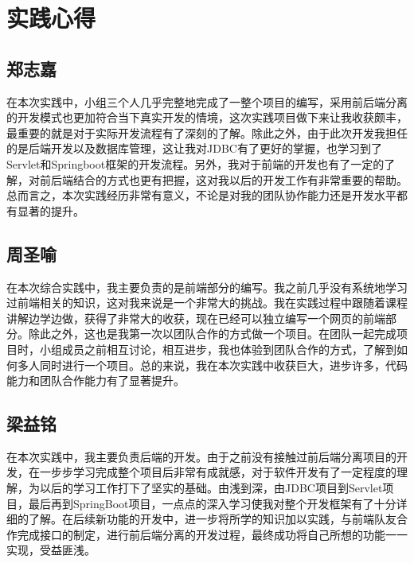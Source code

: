 
\chapter{实践心得}

\section*{郑志嘉}
在本次实践中，小组三个人几乎完整地完成了一整个项目的编写，采用前后端分离的开发模式也更加符合当下真实开发的情境，这次实践项目做下来让我收获颇丰，最重要的就是对于实际开发流程有了深刻的了解。除此之外，由于此次开发我担任的是后端开发以及数据库管理，这让我对JDBC有了更好的掌握，也学习到了Servlet和Springboot框架的开发流程。另外，我对于前端的开发也有了一定的了解，对前后端结合的方式也更有把握，这对我以后的开发工作有非常重要的帮助。总而言之，本次实践经历非常有意义，不论是对我的团队协作能力还是开发水平都有显著的提升。~\\

\section*{周圣喻}
在本次综合实践中，我主要负责的是前端部分的编写。我之前几乎没有系统地学习过前端相关的知识，这对我来说是一个非常大的挑战。我在实践过程中跟随着课程讲解边学边做，获得了非常大的收获，现在已经可以独立编写一个网页的前端部分。除此之外，这也是我第一次以团队合作的方式做一个项目。在团队一起完成项目时，小组成员之前相互讨论，相互进步，我也体验到团队合作的方式，了解到如何多人同时进行一个项目。总的来说，我在本次实践中收获巨大，进步许多，代码能力和团队合作能力有了显著提升。~\\

\section*{梁益铭}
在本次实践中，我主要负责后端的开发。由于之前没有接触过前后端分离项目的开发，在一步步学习完成整个项目后非常有成就感，对于软件开发有了一定程度的理解，为以后的学习工作打下了坚实的基础。由浅到深，由JDBC项目到Servlet项目，最后再到SpringBoot项目，一点点的深入学习使我对整个开发框架有了十分详细的了解。在后续新功能的开发中，进一步将所学的知识加以实践，与前端队友合作完成接口的制定，进行前后端分离的开发过程，最终成功将自己所想的功能一一实现，受益匪浅。